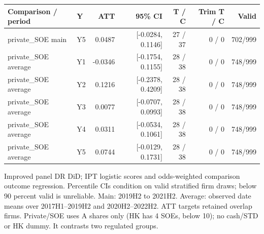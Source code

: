 \par\medskip
\begin{tabular}{llrrrrr}
\toprule
Comparison / period & Y & ATT & 95\% CI & T / C & Trim T / C & Valid \\
\midrule
private\_SOE main & Y5 & 0.0487 & [-0.0284, 0.1146] & 27 / 37 & 0 / 0 & 702/999 \\
private\_SOE average & Y1 & -0.0346 & [-0.1754, 0.1155] & 28 / 38 & 0 / 0 & 748/999 \\
private\_SOE average & Y2 & 0.1216 & [-0.2378, 0.4209] & 28 / 38 & 0 / 0 & 748/999 \\
private\_SOE average & Y3 & 0.0077 & [-0.0707, 0.0993] & 28 / 38 & 0 / 0 & 748/999 \\
private\_SOE average & Y4 & 0.0311 & [-0.0534, 0.1061] & 28 / 38 & 0 / 0 & 748/999 \\
private\_SOE average & Y5 & 0.0744 & [-0.0129, 0.1731] & 28 / 38 & 0 / 0 & 748/999 \\
\bottomrule
\end{tabular}
\par\medskip
\footnotesize Improved panel DR DiD; IPT logistic scores and odds-weighted comparison outcome regression. Percentile CIs condition on valid stratified firm draws; below 90 percent valid is unreliable. Main: 2019H2 to 2021H2. Average: observed date means over 2017H1--2019H2 and 2020H2--2022H2. ATT targets retained overlap firms. Private/SOE uses A shares only (HK has 4 SOEs, below 10); no cash/STD or HK dummy. It contrasts two regulated groups.
\endgroup

